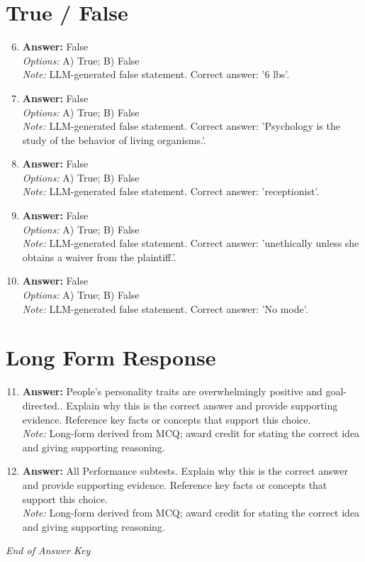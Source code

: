 \documentclass[12pt]{article}
\begin{document}
\section*{True / False}
\begin{enumerate}[label=\arabic*.]
\setcounter{enumi}{5}
\item \textbf{Answer:} False
\\ \textit{Options:} A) True; B) False
\\ \textit{Note:} LLM-generated false statement. Correct answer: '6 lbs'.
\item \textbf{Answer:} False
\\ \textit{Options:} A) True; B) False
\\ \textit{Note:} LLM-generated false statement. Correct answer: 'Psychology is the study of the behavior of living organisms.'.
\item \textbf{Answer:} False
\\ \textit{Options:} A) True; B) False
\\ \textit{Note:} LLM-generated false statement. Correct answer: 'receptionist'.
\item \textbf{Answer:} False
\\ \textit{Options:} A) True; B) False
\\ \textit{Note:} LLM-generated false statement. Correct answer: 'unethically unless she obtains a waiver from the plaintiff.'.
\item \textbf{Answer:} False
\\ \textit{Options:} A) True; B) False
\\ \textit{Note:} LLM-generated false statement. Correct answer: 'No mode'.
\end{enumerate}

\section*{Long Form Response}
\begin{enumerate}[label=\arabic*.]
\setcounter{enumi}{10}
\item \textbf{Answer:} People's personality traits are overwhelmingly positive and goal-directed.. Explain why this is the correct answer and provide supporting evidence. Reference key facts or concepts that support this choice.
\\ \textit{Note:} Long-form derived from MCQ; award credit for stating the correct idea and giving supporting reasoning.
\item \textbf{Answer:} All Performance subtests. Explain why this is the correct answer and provide supporting evidence. Reference key facts or concepts that support this choice.
\\ \textit{Note:} Long-form derived from MCQ; award credit for stating the correct idea and giving supporting reasoning.
\end{enumerate}

\vfill
\noindent\textit{End of Answer Key}
\end{document}
